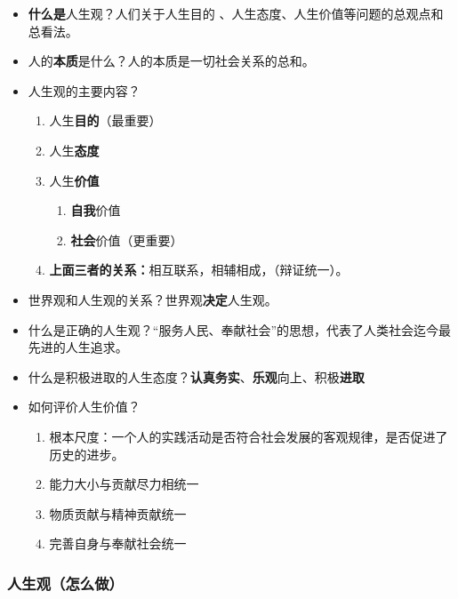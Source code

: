 \begin{itemize}
\tightlist
\item
  \textbf{什么是}人生观？人们关于人生目的
  、人生态度、人生价值等问题的总观点和总看法。
\item
  人的\textbf{本质}是什么？人的本质是一切社会关系的总和。
\item
  人生观的主要内容？

  \begin{enumerate}
  \def\labelenumi{\arabic{enumi}.}
  \tightlist
  \item
    人生\textbf{目的}（最重要）
  \item
    人生\textbf{态度}
  \item
    人生\textbf{价值}

    \begin{enumerate}
    \def\labelenumii{\arabic{enumii}.}
    \tightlist
    \item
      \textbf{自我}价值
    \item
      \textbf{社会}价值（更重要）
    \end{enumerate}
  \item
    \textbf{上面三者的关系：}相互联系，相辅相成，（辩证统一）。
  \end{enumerate}
\item
  世界观和人生观的关系？世界观\textbf{决定}人生观。
\item
  什么是正确的人生观？``服务人民、奉献社会''的思想，代表了人类社会迄今最先进的人生追求。
\item
  什么是积极进取的人生态度？\textbf{认真务实}、\textbf{乐观}向上、积极\textbf{进取}
\item
  如何评价人生价值？

  \begin{enumerate}
  \def\labelenumi{\arabic{enumi}.}
  \setcounter{enumi}{-1}
  \tightlist
  \item
    根本尺度：一个人的实践活动是否符合社会发展的客观规律，是否促进了历史的进步。
  \item
    能力大小与贡献尽力相统一
  \item
    物质贡献与精神贡献统一
  \item
    完善自身与奉献社会统一
  \end{enumerate}
\end{itemize}

\hypertarget{ux4ebaux751fux89c2ux600eux4e48ux505a}{%
\subsubsection{人生观（怎么做）}\label{ux4ebaux751fux89c2ux600eux4e48ux505a}}

